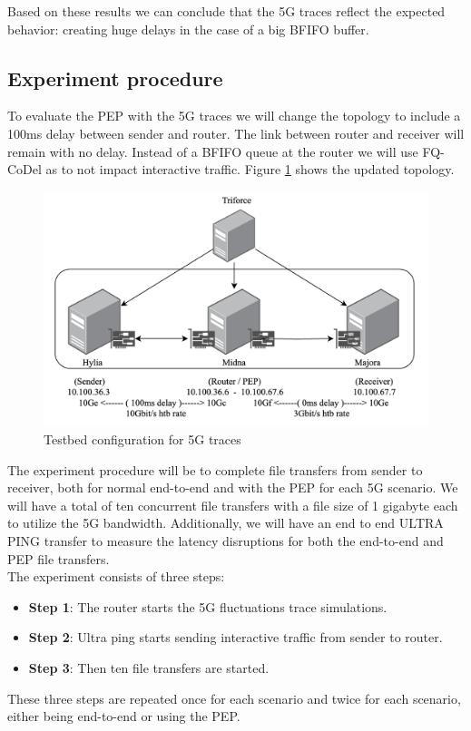 \documentclass[a4paper,english, 11pt]{report}
\begin{document}
Based on these results we can conclude that the 5G traces reflect the expected behavior: creating huge delays in the case of a big BFIFO buffer.

\subsection{Experiment procedure}
To evaluate the PEP with the 5G traces we will change the topology to include a 100ms delay between sender and router. The link between router and receiver will remain with no delay. Instead of a BFIFO queue at the router we will use FQ-CoDel as to not impact interactive traffic. Figure \ref{fig:testbed2} shows the updated topology.\\

\begin{figure}[!h!] %
	\centering
	\includegraphics[scale=0.60]{../diagrams/drawio/testbed2.png}
  	\caption{Testbed configuration for 5G traces}
  	\label{fig:testbed2}
\end{figure}

The experiment procedure will be to complete file transfers from sender to receiver, both for normal end-to-end and with the PEP for each 5G scenario. We will have a total of ten concurrent file transfers with a file size of 1 gigabyte each to utilize the 5G bandwidth. Additionally, we will have an end to end ULTRA PING transfer to measure the latency disruptions for both the end-to-end and PEP file transfers.\\

The experiment consists of three steps:
\begin{itemize}
  \item \textbf{Step 1}: The router starts the 5G fluctuations trace simulations.
  \item \textbf{Step 2}: Ultra ping starts sending interactive traffic from sender to router.
  \item \textbf{Step 3}: Then ten file transfers are started.
\end{itemize}
These three steps are repeated once for each scenario and twice for each scenario, either being end-to-end or using the PEP.
\end{document}
